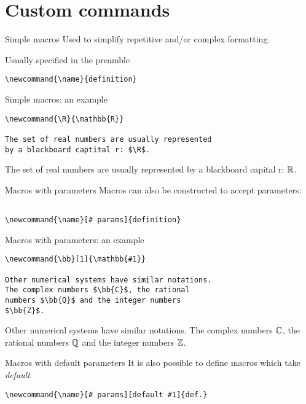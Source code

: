 \section{Custom commands}

\begin{frame}[fragile]{Simple macros}
  Used to simplify repetitive and/or complex formatting.

  Usually specified in the preamble
  \begin{lstlisting}
\newcommand{\name}{definition}
  \end{lstlisting}
\end{frame}

\begin{frame}[fragile]{Simple macros: an example}
  \begin{lstlisting}
\newcommand{\R}{\mathbb{R}}

The set of real numbers are usually represented
by a blackboard captital r: $\R$.
  \end{lstlisting}

  The set of real numbers are usually represented by a blackboard capital r:
  $\R$.
\end{frame}

\begin{frame}[fragile]{Macros with parameters}
  Macros can also be constructed to accept parameters:
  \begin{lstlisting}

\newcommand{\name}[# params]{definition}
  \end{lstlisting}
\end{frame}

\begin{frame}[fragile]{Macros with parameters: an example}
  \begin{lstlisting}
\newcommand{\bb}[1]{\mathbb{#1}}

Other numerical systems have similar notations. 
The complex numbers $\bb{C}$, the rational 
numbers $\bb{Q}$ and the integer numbers
$\bb{Z}$.

  \end{lstlisting}
  Other numerical systems have similar notations. The complex numbers $\bb{C}$,
  the rational numbers $\bb{Q}$ and the integer numbers $\bb{Z}$.
\end{frame}

\begin{frame}[fragile]{Macros with default parameters}
  It is also possible to define macros which take \textsl{default}
  \begin{lstlisting}
\newcommand{\name}[# params][default #1]{def.}

  \end{lstlisting}
\end{frame}

